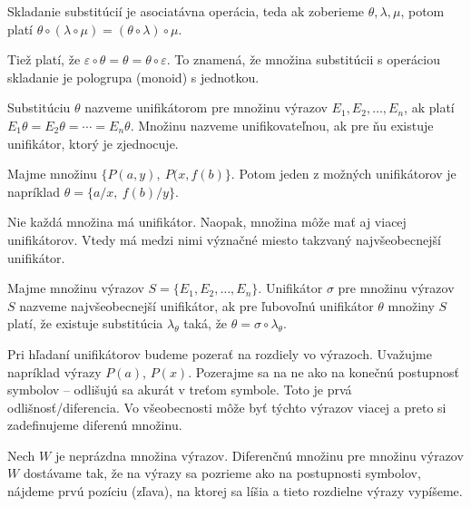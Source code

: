 \begin{poznamka}
    Skladanie substitúcií je asociatávna operácia, teda ak zoberieme 
    $\theta, \lambda, \mu$, potom platí 
    $\theta \circ(\lambda \circ \mu) = (\theta \circ \lambda) \circ \mu$.

    Tiež platí, že $\varepsilon \circ \theta = \theta = 
            \theta \circ \varepsilon$.
    To znamená, že množina substitúcii s operáciou skladanie je
    pologrupa (monoid) s jednotkou.
\end{poznamka}

\begin{definicia}[unifikátor]
    Substitúciu $\theta$ nazveme unifikátorom pre
    množinu výrazov $E_1, E_2, \dots, E_n$,
    ak platí $E_1\theta = E_2\theta = \cdots = E_n\theta$.
    Množinu nazveme unifikovateľnou, ak pre ňu existuje
    unifikátor, ktorý je zjednocuje.
\end{definicia}

\begin{priklad}
    Majme množinu $\{P(a,y),\ P(x,f(b)\}$.
    Potom jeden z možných unifikátorov je napríklad
    $\theta = \{a/x,\ f(b)/y\}$.
\end{priklad}

\begin{poznamka}
    Nie každá množina má unifikátor. Naopak, množina môže mať aj
    viacej unifikátorov. Vtedy má medzi nimi význačné miesto takzvaný
    najvšeobecnejší unifikátor.
\end{poznamka}

\begin{definicia}
    Majme množinu výrazov $S=\{ E_1, E_2, \ldots, E_n\}$.
    Unifikátor $\sigma$ pre množinu výrazov $S$ nazveme 
    najvšeobecnejší unifikátor, ak pre ľubovoľnú unifikátor $\theta$
    množiny $S$ platí, že existuje substitúcia 
    $\lambda_{\theta}$ taká, že $\theta = \sigma \circ \lambda_{\theta}$.
\end{definicia}

\medskip
Pri hľadaní unifikátorov budeme pozerať na rozdiely vo výrazoch.
Uvažujme napríklad výrazy $P(a)$, $P(x)$.
Pozerajme sa na ne ako na konečnú postupnosť symbolov -- 
odlišujú sa akurát v treťom symbole. Toto je prvá odlišnosť/diferencia.
Vo všeobecnosti môže byť týchto výrazov viacej a preto si zadefinujeme
diferenú množinu.

\begin{definicia}
Nech $W$ je neprázdna množina výrazov.
Diferenčnú množinu pre množinu výrazov $W$ dostávame tak, 
že na výrazy sa pozrieme ako na postupnosti symbolov, nájdeme prvú pozíciu
(zľava), na ktorej sa líšia a tieto rozdielne výrazy vypíšeme.
\end{definicia}

